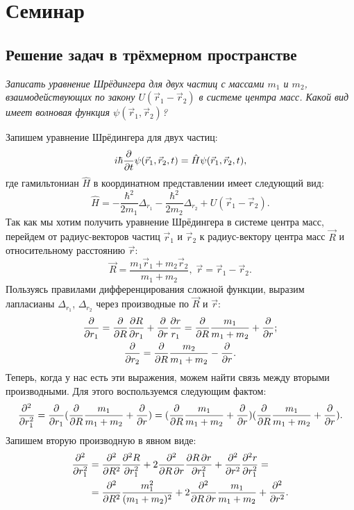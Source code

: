 \section{Семинар \thesection}
\subsection{Решение задач в трёхмерном пространстве}
\begin{exercise}
  \textit{Записать уравнение Шрёдингера для двух частиц с массами $m_1$ и $m_2$,
    взаимодействующих по закону $U(\Vec{r}_1 - \Vec{r}_2)$ в системе центра масс.
    Какой вид имеет волновая функция $\psi(\Vec{r}_1, \Vec{r}_2)$?}
\end{exercise}

Запишем уравнение Шрёдингера для двух частиц:
\[
  i\hbar\frac{\partial }{\partial t}\psi(\Vec{r}_1, \Vec{r}_2, t) = \hat{H}\psi(\Vec{r}_1, \Vec{r}_2, t),
\]
где гамильтониан $\hat{H}$ в координатном представлении имеет следующий вид:
\[
  \hat{H} = -\frac{\hbar^2}{2m_1}\Delta_{r_1} -\frac{\hbar^2}{2m_2}\Delta_{r_2} + U(\Vec{r}_1 - \Vec{r}_2).
\]
Так как мы хотим получить уравнение Шрёдингера в системе центра масс, перейдем
от радиус-векторов частиц $\Vec{r}_1$ и $\Vec{r}_2$ к радиус-вектору центра
масс $\Vec{R}$ и относительному расстоянию $\Vec{r}$:
\[
  \Vec{R} = \frac{m_1\Vec{r}_1 + m_2\Vec{r}_2}{m_1 + m_2}, \; \Vec{r} = \Vec{r}_1 - \Vec{r}_2.
\]
Пользуясь правилами дифференцирования сложной функции, выразим лапласианы
$\Delta_{r_1}$, $\Delta_{r_2}$ через производные по $\Vec{R}$ и $\Vec{r}$:
\begin{gather*}
  \frac{\partial }{\partial r_1} = \frac{\partial }{\partial R}\frac{\partial R}{\partial r_1} + \frac{\partial }{\partial r}\frac{\partial r}{r_1} = \frac{\partial }{\partial R}\frac{m_1}{m_1 + m_2} + \frac{\partial }{\partial r};\\
  \frac{\partial }{\partial r_2} = \frac{\partial }{\partial R}\frac{m_2}{m_1 + m_2} - \frac{\partial }{\partial r}.
\end{gather*}
Теперь, когда у нас есть эти выражения, можем найти связь между вторыми
производными. Для этого воспользуемся следующим фактом:
\[
  \frac{\partial^2}{\partial r_1^2} = \frac{\partial }{\partial r_1}(\frac{\partial }{\partial R}\frac{m_1}{m_1 + m_2} + \frac{\partial }{\partial r}) = (\frac{\partial }{\partial R}\frac{m_1}{m_1 + m_2} + \frac{\partial }{\partial r})(\frac{\partial }{\partial R}\frac{m_1}{m_1 + m_2} + \frac{\partial }{\partial r}).
\]
Запишем вторую производную в явном виде:
\begin{align*}
  \frac{\partial^2}{\partial r_1^2} &= \frac{\partial^2}{\partial R^2} \frac{\partial^2 R}{\partial r_1^2} + 2\frac{\partial^2}{\partial R\,\partial r}\frac{\partial R\,\partial r}{\partial r_1^2} + \frac{\partial^2}{\partial r^2} \frac{\partial^2 r}{\partial r_1^2} = \\
  &= \frac{\partial^2}{\partial R^2} \frac{m_1^2}{(m_1 + m_2)^2} + 2\frac{\partial^2}{\partial R\,\partial r}\frac{m_1}{m_1 + m_2} +  \frac{\partial^2}{\partial r^2}.
\end{align*}
